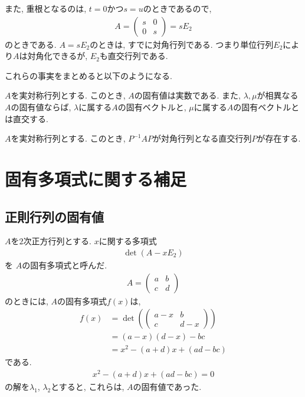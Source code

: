また,
重根となるのは,
$t=0$かつ$s=u$のときであるので,
\begin{align*}
  A=\begin{pmatrix}s&0\\0&s\end{pmatrix}=sE_2
\end{align*}
のときである.
$A=sE_2$のときは,
すでに対角行列である.
つまり単位行列$E_2$により$A$は対角化できるが,
$E_2$も直交行列である.

これらの事実をまとめると以下のようになる.
\begin{theorem}
  \label{thm:symmat:eigen}
  $A$を実対称行列とする.
  このとき, $A$の固有値は実数である.
  また, $\lambda,\mu$が相異なる$A$の固有値ならば,
  $\lambda$に属する$A$の固有ベクトルと,
  $\mu$に属する$A$の固有ベクトルとは直交する.
\end{theorem}
\begin{theorem}
  \label{thm:symmat:diag}
  $A$を実対称行列とする.
  このとき, $P^{-1}AP$が対角行列となる直交行列$P$が存在する.
\end{theorem}


\section{固有多項式に関する補足}
\subsection{正則行列の固有値}
  $A$を$2$次正方行列とする.
  $x$に関する多項式
  \begin{align*}
  \det(A-xE_2)
  \end{align*}
  を
  $A$の固有多項式と呼んだ.
  \begin{align*}
    A=\begin{pmatrix}a&b\\c&d\end{pmatrix}
  \end{align*}
  のときには,
  $A$の固有多項式$f(x)$は,
  \begin{align*}
    f(x)&=\det(\begin{pmatrix}a-x&b\\c&d-x\end{pmatrix}) \\
      &=
      (a-x)(d-x)-bc\\
      &=x^2-(a+d)x+(ad-bc)
  \end{align*}
  である.
  \begin{align*}
    x^2-(a+d)x+(ad-bc)=0
  \end{align*}
  の解を$\lambda_1$, $\lambda_2$とすると,
  これらは, $A$の固有値であった.

